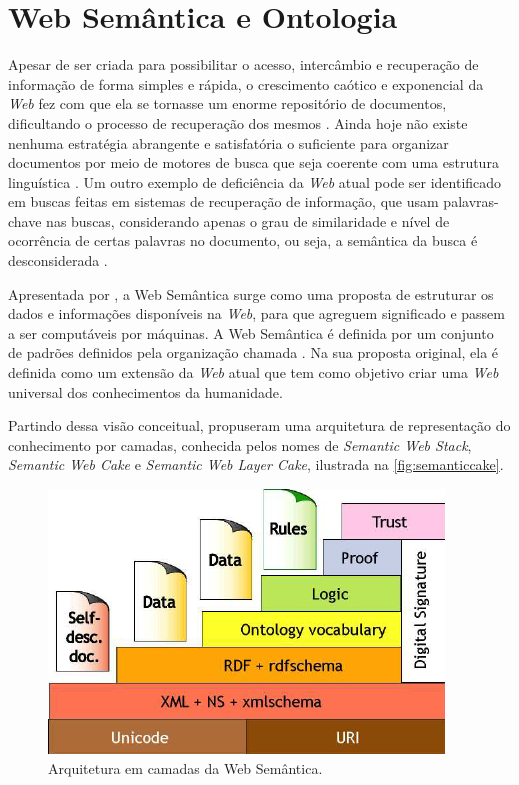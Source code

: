 \section{Web Semântica e Ontologia}

	Apesar de ser criada para possibilitar o acesso, intercâmbio e recuperação de informação de forma simples e rápida, o crescimento caótico e exponencial da \textit{Web} fez com que ela se tornasse um enorme repositório de documentos, dificultando o processo de recuperação dos mesmos \cite{Suarez2017}. Ainda hoje não existe nenhuma estratégia abrangente e satisfatória o suficiente para organizar documentos por meio de motores de busca que seja coerente com uma estrutura linguística \cite{Ci.Inf.1077}. Um outro exemplo de deficiência da \textit{Web} atual pode ser identificado em buscas feitas em sistemas de recuperação de informação, que usam palavras-chave nas buscas, considerando apenas o grau de similaridade e nível de ocorrência de certas palavras no documento, ou seja, a semântica da busca é desconsiderada \cite{Ci.Inf.1077}.
    
    Apresentada por , a Web Semântica surge como uma proposta de estruturar os dados e informações disponíveis na \textit{Web}, para que agreguem significado e passem a ser computáveis por máquinas. A Web Semântica é definida por um conjunto de padrões definidos pela organização chamada . Na sua proposta original, ela é definida como um extensão da \textit{Web} atual que tem como objetivo criar uma \textit{Web} universal dos conhecimentos da humanidade.
    
    Partindo dessa visão conceitual,  propuseram uma arquitetura de representação do conhecimento por camadas, conhecida pelos nomes de \textit{Semantic Web Stack}, \textit{Semantic Web Cake} e \textit{Semantic Web Layer Cake}, ilustrada na \autoref{fig:semanticcake}.
    
    \begin{figure}[htb]
    	\centering
        \caption{Arquitetura em camadas da Web Semântica.}
    	\label{fig:semanticcake}
        \includegraphics[width=0.7\linewidth]{images/semantic-web-cake}
    \end{figure}
    
